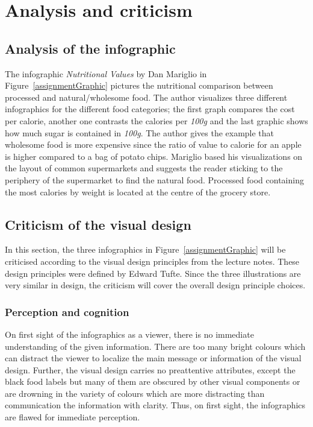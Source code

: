 \section{Analysis and criticism}

\subsection{Analysis of the infographic}

The infographic \textit{Nutritional Values} by Dan Mariglio in
Figure~\ref{assignmentGraphic} pictures the nutritional comparison between
processed and natural/wholesome food. The author visualizes three different
infographics for the different food categories; the first graph compares the
cost per calorie, another one contrasts the calories per \textit{100g} and the
last graphic shows how much sugar is contained in \textit{100g}. The author
gives the example that wholesome food is more expensive since the ratio of value
to calorie for an apple is higher compared to a bag of potato chips. Mariglio
based his visualizations on the layout of common supermarkets and suggests the
reader sticking to the periphery of the supermarket to find the natural food.
Processed food containing the most calories by weight is located at the centre
of the grocery store.

\subsection{Criticism of the visual design}

In this section, the three infographics in Figure~\ref{assignmentGraphic} will
be criticised according to the visual design principles from the lecture notes.
These design principles were defined by Edward Tufte\cite{Tufte2001}. Since the
three illustrations are very similar in design, the criticism will cover the
overall design principle choices.

\subsubsection{Perception and cognition}

On first sight of the infographics as a viewer, there is no immediate
understanding of the given information. There are too many bright colours which
can distract the viewer to localize the main message or information of the
visual design. Further, the visual design carries no preattentive attributes,
except the black food labels but many of them are obscured by other visual
components or are drowning in the variety of colours which are more distracting
than communication the information with clarity.  Thus, on first sight, the
infographics are flawed for immediate perception.

